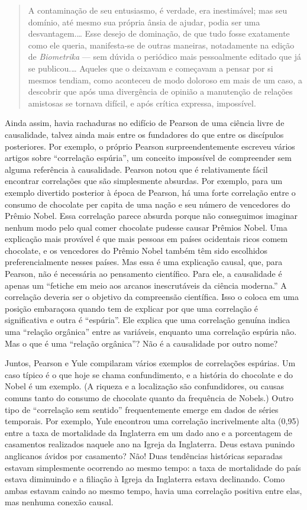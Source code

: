 \documentclass[11pt,a5paper,twoside]{book}
\begin{document}
\begin{quote}
A contaminação de seu entusiasmo, é verdade, era inestimável; mas seu domínio, até mesmo sua própria ânsia de ajudar, podia ser uma desvantagem.… Esse desejo de dominação, de que tudo fosse exatamente como ele queria, manifesta-se de outras maneiras, notadamente na edição de \textit{Biometrika} — sem dúvida o periódico mais pessoalmente editado que já se publicou.… Aqueles que o deixavam e começavam a pensar por si mesmos tendiam, como aconteceu de modo doloroso em mais de um caso, a descobrir que após uma divergência de opinião a manutenção de relações amistosas se tornava difícil, e após crítica expressa, impossível.
\end{quote}
Ainda assim, havia rachaduras no edifício de Pearson de uma ciência livre de causalidade, talvez ainda mais entre os fundadores do que entre os discípulos posteriores. Por exemplo, o próprio Pearson surpreendentemente escreveu vários artigos sobre “correlação espúria”, um conceito impossível de compreender sem alguma referência à causalidade. Pearson notou que é relativamente fácil encontrar correlações que são simplesmente absurdas. Por exemplo, para um exemplo divertido posterior à época de Pearson, há uma forte correlação entre o consumo de chocolate per capita de uma nação e seu número de vencedores do Prêmio Nobel. Essa correlação parece absurda porque não conseguimos imaginar nenhum modo pelo qual comer chocolate pudesse causar Prêmios Nobel. Uma explicação mais provável é que mais pessoas em países ocidentais ricos comem chocolate, e os vencedores do Prêmio Nobel também têm sido escolhidos preferencialmente nesses países. Mas essa é uma explicação causal, que, para Pearson, não é necessária ao pensamento científico. Para ele, a causalidade é apenas um “fetiche em meio aos arcanos inescrutáveis da ciência moderna.” A correlação deveria ser o objetivo da compreensão científica. Isso o coloca em uma posição embaraçosa quando tem de explicar por que uma correlação é significativa e outra é “espúria”. Ele explica que uma correlação genuína indica uma “relação orgânica” entre as variáveis, enquanto uma correlação espúria não. Mas o que é uma “relação orgânica”? Não é a causalidade por outro nome?

Juntos, Pearson e Yule compilaram vários exemplos de correlações espúrias. Um caso típico é o que hoje se chama confundimento, e a história do chocolate e do Nobel é um exemplo. (A riqueza e a localização são confundidores, ou causas comuns tanto do consumo de chocolate quanto da frequência de Nobels.) Outro tipo de “correlação sem sentido” frequentemente emerge em dados de séries temporais. Por exemplo, Yule encontrou uma correlação incrivelmente alta (0,95) entre a taxa de mortalidade da Inglaterra em um dado ano e a porcentagem de casamentos realizados naquele ano na Igreja da Inglaterra. Deus estava punindo anglicanos ávidos por casamento? Não! Duas tendências históricas separadas estavam simplesmente ocorrendo ao mesmo tempo: a taxa de mortalidade do país estava diminuindo e a filiação à Igreja da Inglaterra estava declinando. Como ambas estavam caindo ao mesmo tempo, havia uma correlação positiva entre elas, mas nenhuma conexão causal.
\end{document}
